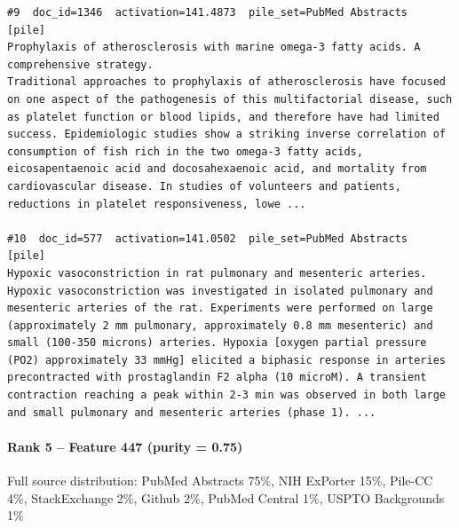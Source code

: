 \begin{verbatim}
#9  doc_id=1346  activation=141.4873  pile_set=PubMed Abstracts  [pile]
Prophylaxis of atherosclerosis with marine omega-3 fatty acids. A comprehensive strategy.
Traditional approaches to prophylaxis of atherosclerosis have focused on one aspect of the pathogenesis of this multifactorial disease, such as platelet function or blood lipids, and therefore have had limited success. Epidemiologic studies show a striking inverse correlation of consumption of fish rich in the two omega-3 fatty acids, eicosapentaenoic acid and docosahexaenoic acid, and mortality from cardiovascular disease. In studies of volunteers and patients, reductions in platelet responsiveness, lowe ...

#10  doc_id=577  activation=141.0502  pile_set=PubMed Abstracts  [pile]
Hypoxic vasoconstriction in rat pulmonary and mesenteric arteries.
Hypoxic vasoconstriction was investigated in isolated pulmonary and mesenteric arteries of the rat. Experiments were performed on large (approximately 2 mm pulmonary, approximately 0.8 mm mesenteric) and small (100-350 microns) arteries. Hypoxia [oxygen partial pressure (PO2) approximately 33 mmHg] elicited a biphasic response in arteries precontracted with prostaglandin F2 alpha (10 microM). A transient contraction reaching a peak within 2-3 min was observed in both large and small pulmonary and mesenteric arteries (phase 1). ...

\end{verbatim}

\paragraph*{Rank 5 -- Feature 447 (purity = 0.75)}

Full source distribution: PubMed Abstracts 75\%, NIH ExPorter 15\%, Pile-CC 4\%, StackExchange 2\%, Github 2\%, PubMed Central 1\%, USPTO Backgrounds 1\%

